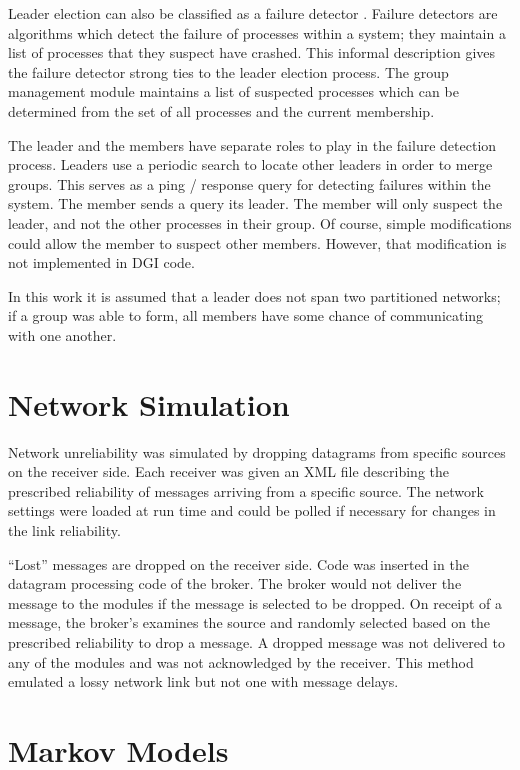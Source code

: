Leader election can also be classified as a failure detector \cite{LEADERELECTIONEVAL}.
Failure detectors are algorithms which detect the failure of processes within a system; they maintain a list of processes that they suspect have crashed.
This informal description gives the failure detector strong ties to the leader election process. 
The group management module maintains a list of suspected processes which can be determined from the set of all processes and the current membership.

The leader and the members have separate roles to play in the failure detection process.
Leaders use a periodic search to locate other leaders in order to merge groups.
This serves as a ping / response query for detecting failures within the system.
The member sends a query its leader.
The member will only suspect the leader, and not the other processes in their group.
Of course, simple modifications could allow the member to suspect other members.
However, that modification is not implemented in DGI code.

In this work it is assumed that a leader does not span two partitioned networks; if a group was able to form, all members have some chance of communicating with one another.

\section{Network Simulation}

Network unreliability was simulated by dropping datagrams from specific sources on the receiver side.
Each receiver was given an XML file describing the prescribed reliability of messages arriving from a specific source.
The network settings were loaded at run time and could be polled if necessary for changes in the link reliability.

``Lost'' messages are dropped on the receiver side. 
Code was inserted in the datagram processing code of the broker.
The broker would not deliver the message to the modules if the message is selected to be dropped.
On receipt of a message, the broker's examines the source and randomly selected based on the prescribed reliability to drop a message.
A dropped message was not delivered to any of the modules and was not acknowledged by the receiver.
This method emulated a lossy network link but not one with message delays.

\section{Markov Models}

